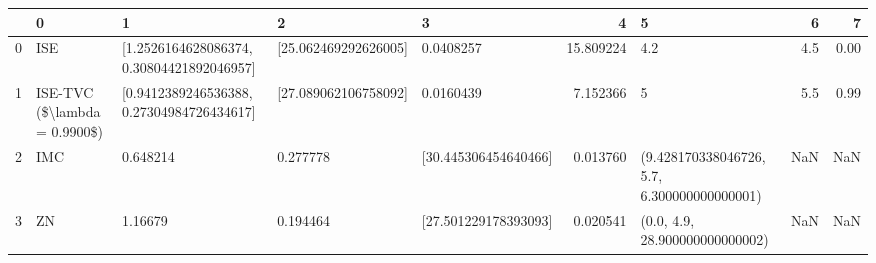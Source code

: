 \begin{tabular}{lllllrlrr}
\toprule
{} &                             0 &                                          1 &                     2 &                     3 &          4 &                                            5 &    6 &     7 \\
\midrule
0 &                           ISE &  [1.2526164628086374, 0.30804421892046957] &  [25.062469292626005] &             0.0408257 &  15.809224 &                                          4.2 &  4.5 &  0.00 \\
1 &  ISE-TVC (\$\textbackslash lambda = 0.9900\$) &  [0.9412389246536388, 0.27304984726434617] &  [27.089062106758092] &             0.0160439 &   7.152366 &                                            5 &  5.5 &  0.99 \\
2 &                           IMC &                                   0.648214 &              0.277778 &  [30.445306454640466] &   0.013760 &  (9.428170338046726, 5.7, 6.300000000000001) &  NaN &   NaN \\
3 &                            ZN &                                    1.16679 &              0.194464 &  [27.501229178393093] &   0.020541 &               (0.0, 4.9, 28.900000000000002) &  NaN &   NaN \\
\bottomrule
\end{tabular}
